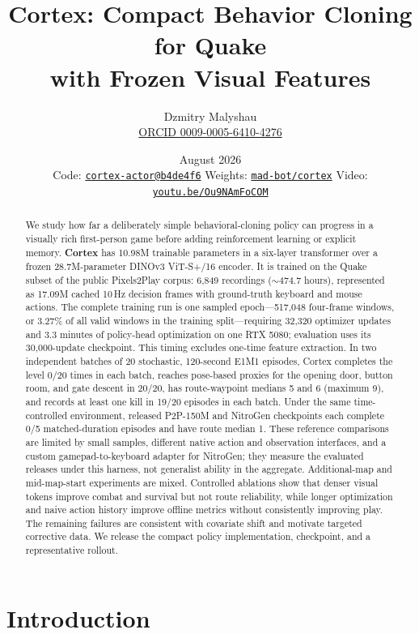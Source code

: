 \documentclass[11pt]{article}
\title{\textbf{Cortex: Compact Behavior Cloning for Quake\\with Frozen Visual Features}}
\author{Dzmitry Malyshau\\[-1pt]
\small \href{https://orcid.org/0009-0005-6410-4276}{ORCID 0009-0005-6410-4276}}
\date{%
August 2026\\[4pt]
\small Code: \href{https://github.com/kvark/cortex-actor/tree/b4de4f66420df2c408ec42b5c01c91a088d8b63d}{\texttt{cortex-actor@b4de4f6}} \;\textperiodcentered\;
Weights: \href{https://huggingface.co/mad-bot/cortex}{\texttt{mad-bot/cortex}} \;\textperiodcentered\;
Video: \href{https://youtu.be/Ou9NAmFoCOM}{\texttt{youtu.be/Ou9NAmFoCOM}}}
\begin{document}
\maketitle

\begin{abstract}
We study how far a deliberately simple behavioral-cloning policy can progress in a visually rich first-person game before adding reinforcement learning or explicit memory. \textbf{Cortex} has 10.98M trainable parameters in a six-layer transformer over a frozen 28.7M-parameter DINOv3 ViT-S+/16 encoder. It is trained on the Quake subset of the public Pixels2Play corpus: 6{,}849 recordings (${\sim}474.7$ hours), represented as 17.09M cached 10\,Hz decision frames with ground-truth keyboard and mouse actions. The complete training run is one sampled epoch---517{,}048 four-frame windows, or 3.27\% of all valid windows in the training split---requiring 32{,}320 optimizer updates and 3.3 minutes of policy-head optimization on one RTX 5080; evaluation uses its 30{,}000-update checkpoint. This timing excludes one-time feature extraction. In two independent batches of 20 stochastic, 120-second E1M1 episodes, Cortex completes the level 0/20 times in each batch, reaches pose-based proxies for the opening door, button room, and gate descent in 20/20, has route-waypoint medians 5 and 6 (maximum 9), and records at least one kill in 19/20 episodes in each batch. Under the same time-controlled environment, released P2P-150M and NitroGen checkpoints each complete 0/5 matched-duration episodes and have route median 1. These reference comparisons are limited by small samples, different native action and observation interfaces, and a custom gamepad-to-keyboard adapter for NitroGen; they measure the evaluated releases under this harness, not generalist ability in the aggregate. Additional-map and mid-map-start experiments are mixed. Controlled ablations show that denser visual tokens improve combat and survival but not route reliability, while longer optimization and naive action history improve offline metrics without consistently improving play. The remaining failures are consistent with covariate shift and motivate targeted corrective data. We release the compact policy implementation, checkpoint, and a representative rollout.
\end{abstract}

\section{Introduction}\label{sec:intro}
\end{document}
